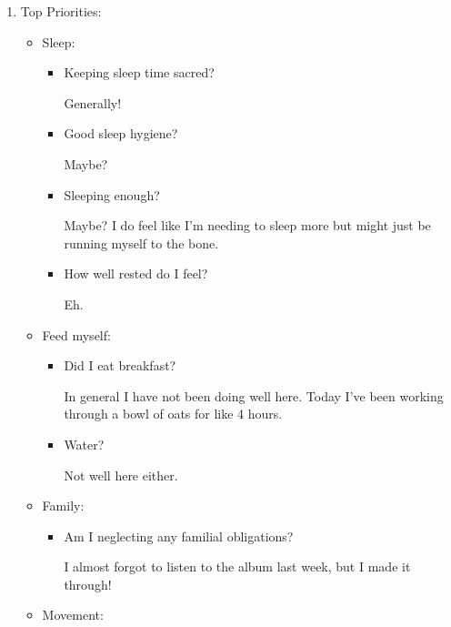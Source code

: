 \documentclass[12pt]{article}
\renewcommand{\,}{\textsuperscript{,}}
\begin{document}
\begin{enumerate}

\item Top Priorities:

\begin{itemize}

\item Sleep:

\begin{itemize}

\item Keeping sleep time sacred?

Generally!

\item Good sleep hygiene?

Maybe?

\item Sleeping enough?

Maybe? I do feel like I'm needing to sleep more but might just be running myself to the bone.

\item How well rested do I feel?

Eh.

\end{itemize}

\item Feed myself:

\begin{itemize}

\item Did I eat breakfast?

In general I have not been doing well here. Today I've been working through a bowl of oats for like 4 hours.

\item Water?

Not well here either.

\end{itemize}

\item Family:

\begin{itemize}

\item Am I neglecting any familial obligations?

I almost forgot to listen to the album last week, but I made it through!

\end{itemize}

\item Movement:


\end{itemize}
\end{enumerate}
\end{document}
